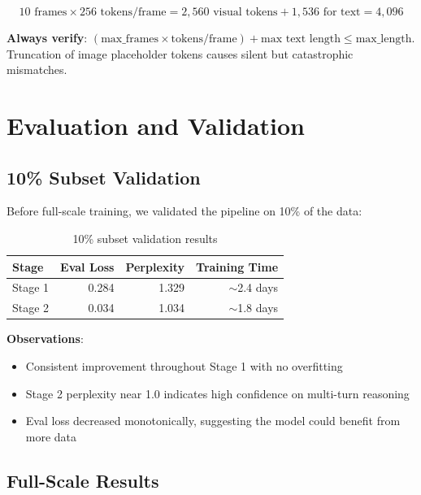 \documentclass[11pt,a4paper]{article}
\begin{document}
\begin{equation}
10 \text{ frames} \times 256 \text{ tokens/frame} = 2{,}560 \text{ visual tokens} + 1{,}536 \text{ for text} = 4{,}096
\end{equation}

\begin{warningbox}
\textbf{Always verify}: $(\text{max\_frames} \times \text{tokens/frame}) + \text{max text length} \leq \text{max\_length}$. Truncation of image placeholder tokens causes silent but catastrophic mismatches.
\end{warningbox}

\section{Evaluation and Validation}

\subsection{10\% Subset Validation}

Before full-scale training, we validated the pipeline on 10\% of the data:

\begin{table}[H]
\centering
\begin{tabular}{@{}lrrr@{}}
\toprule
\textbf{Stage} & \textbf{Eval Loss} & \textbf{Perplexity} & \textbf{Training Time} \\
\midrule
Stage 1 & 0.284 & 1.329 & $\sim$2.4 days \\
Stage 2 & 0.034 & 1.034 & $\sim$1.8 days \\
\bottomrule
\end{tabular}
\caption{10\% subset validation results}
\end{table}

\textbf{Observations}:
\begin{itemize}
    \item Consistent improvement throughout Stage 1 with no overfitting
    \item Stage 2 perplexity near 1.0 indicates high confidence on multi-turn reasoning
    \item Eval loss decreased monotonically, suggesting the model could benefit from more data
\end{itemize}

\subsection{Full-Scale Results}
\end{document}
